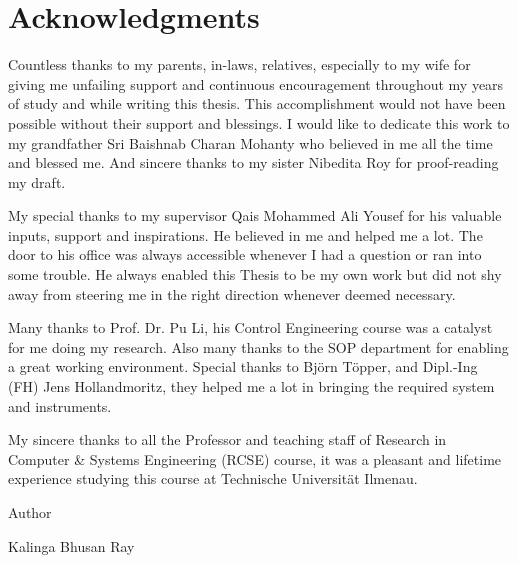 
\section*{Acknowledgments}
Countless thanks to my parents, in-laws, relatives, especially to my wife
for giving me unfailing support and continuous encouragement throughout my 
years of study and while writing this thesis. This accomplishment would not 
have been possible without their support and blessings. I would like to 
dedicate this work to my grandfather Sri Baishnab Charan Mohanty who 
believed in me all the time and blessed me. And sincere thanks to my sister Nibedita Roy for proof-reading my draft.

\vspace{1em}
\noindent My special thanks to my supervisor Qais Mohammed Ali Yousef for his valuable
inputs, support and inspirations. He believed in me and helped me a lot.
The door to his office was always accessible whenever I had a question 
or ran into some trouble. He always enabled this Thesis to be my own work 
but did not shy away from steering me in the right direction whenever deemed necessary.

\vspace{1em}
\noindent Many thanks to Prof. Dr. Pu Li, his Control Engineering course was a 
catalyst for me doing my research. Also many thanks to the SOP department for 
enabling a great working environment. Special thanks to Bj{\"o}rn T{\"o}pper, and Dipl.-Ing (FH) Jens Hollandmoritz,
they helped me a lot in bringing the required system and instruments.

\vspace{1em}
\noindent My sincere thanks to all the Professor and teaching staff of Research 
in Computer \& Systems Engineering (RCSE) course, it was a pleasant and lifetime experience studying this course at Technische Universit{\"a}t Ilmenau.

\vspace{1em}
\noindent Author

\vspace{1em}
\noindent Kalinga Bhusan Ray


